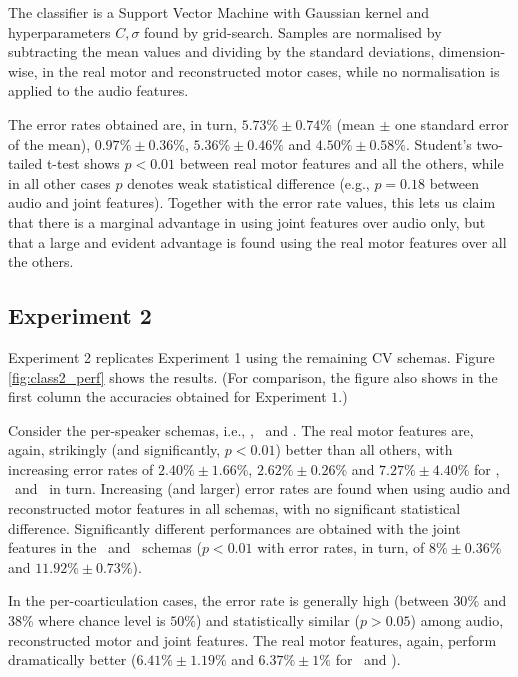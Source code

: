 The classifier is a Support Vector Machine \cite{BGV92} with Gaussian kernel
and hyperparameters $C, \sigma$ found by grid-search. Samples are normalised
by subtracting the mean values and dividing by the standard deviations,
dimension-wise, in the real motor and reconstructed motor cases, while
no normalisation is applied to the audio features.

The error rates obtained are, in turn,
$5.73\% \pm 0.74\%$ (mean $\pm$ one standard error of the mean),
$0.97\% \pm 0.36\%$,
$5.36\% \pm 0.46\%$ and
$4.50\% \pm 0.58\%$. Student's two-tailed t-test shows $p<0.01$ between real motor features
and all the others, while in all other cases $p$ denotes weak statistical difference (e.g.,
$p=0.18$ between audio and joint features). Together with the error rate values, this lets
us claim that there is a marginal advantage in using joint features
over audio only, but that a large and evident advantage is found using the real motor features
over all the others.

\subsection{Experiment 2}
\label{subsec:exp2}

Experiment 2 replicates Experiment 1 using the remaining CV schemas.
Figure \ref{fig:class2_perf} shows the results. (For comparison,
the figure also shows in the first column the accuracies obtained for
Experiment $1$.)

Consider the per-speaker schemas, i.e., \spka, \spkb\ and \spkc. The real motor
features are, again, strikingly (and significantly, $p<0.01$) better than all others,
with increasing error rates of
$2.40\% \pm 1.66\%$,
$2.62\% \pm 0.26\%$ and
$7.27\% \pm 4.40\%$ for \spka, \spkb\ and \spkc\ in turn. Increasing (and larger) error
rates are found when using audio and reconstructed motor features in all schemas, with
no significant statistical difference. Significantly different performances are obtained
with the joint features in the \spkb\ and \spkc\ schemas ($p<0.01$ with error rates, in turn,
of $8\% \pm 0.36\%$ and $11.92\% \pm 0.73\%$).

In the per-coarticulation cases, the error rate is generally high (between $30\%$ and $38\%$
where chance level is $50\%$) and statistically similar ($p>0.05$) among audio, reconstructed
motor and joint features. The real motor features, again, perform dramatically better
($6.41\% \pm 1.19\%$ and $6.37\% \pm 1\%$ for \coa\ and \cob).

